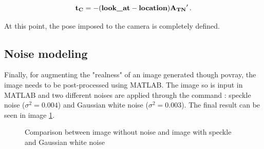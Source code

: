 \begin{equation}
  \mathbf{t_C} = - (\text{\inlinecode{POV}{look_at}} - \text{\inlinecode{POV}{location}}) \mathbf{{A_{TN}}'} \,.
\end{equation}

At this point, the pose imposed to the camera is completely defined.

\subsection{Noise modeling}\label{subsection:addingthenoise}
Finally, for augmenting the "realness" of an image generated though \acrshort{povray}, the image needs to be post-processed using MATLAB.
The image so is input in MATLAB and two different noises are applied through the  command : speckle noise ($\sigma^2 = 0.004$) and Gaussian white noise ($\sigma^2 = 0.003$).
The final result can be seen in image \ref{fig:comparisonNoise}.

\begin{figure}[htbp]
  \centering
  \qquad
  \caption{Comparison between image without noise and image with speckle and Gaussian white noise}
  \label{fig:comparisonNoise}
\end{figure}

